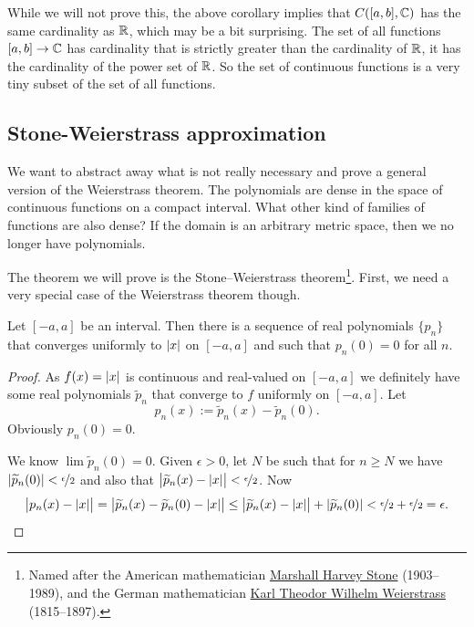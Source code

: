 \begin{remark}
While we will not prove this, the above corollary implies that
$C([a,b],{\mathbb{C}})$ has the same cardinality as ${\mathbb{R}}$, which may be a
bit surprising.  The set of all functions $[a,b] \to {\mathbb{C}}$ has
cardinality that is strictly greater than the cardinality of ${\mathbb{R}}$, it has the
cardinality of the power set of ${\mathbb{R}}$.  So the
set of continuous functions is a very tiny subset of the set of all
functions.
\end{remark}

\subsection{Stone-Weierstrass approximation}

We want to abstract away what is not really
necessary and prove a general version of the Weierstrass theorem.
The polynomials are dense in the space of continuous
functions on a compact interval.  What other kind of families of
functions are also dense?  If the domain is an
arbitrary metric space, then we no longer have polynomials.

The theorem we will prove is the Stone--Weierstrass theorem\footnote{%
Named after the American mathematician
\href{http://en.wikipedia.org/wiki/Marshall_Harvey_Stone}{Marshall Harvey Stone}
(1903--1989), and the German mathematician
\href{http://en.wikipedia.org/wiki/Karl_Weierstrass}{Karl Theodor Wilhelm Weierstrass}
(1815--1897).}.
First,
we need a very
special case of the Weierstrass theorem though.

\begin{cor}
Let $[-a,a]$ be an interval.  Then there is a sequence of real polynomials
$\{ p_n \}$ that converges uniformly to $\lvert {x} \rvert$ on $[-a,a]$ and such that
$p_n(0) = 0$ for all $n$.
\end{cor}

\begin{proof}
As $f(x) = \lvert {x} \rvert$ is continuous and real-valued
on $[-a,a]$ we definitely have some
real polynomials $\widetilde{p}_n$ that converge to $f$
uniformly on $[-a,a]$.
Let
\begin{equation*}
p_n(x) := \widetilde{p}_n(x) - \widetilde{p}_n(0) .
\end{equation*}
Obviously $p_n(0) = 0$.

We know
$\lim \widetilde{p}_n(0) = 0$.  Given $\epsilon > 0$, let $N$ be such that
for $n \geq N$ we have $\lvert {\widetilde{p}_n(0)} \rvert < \nicefrac{\epsilon}{2}$
and also that $\bigl\lvert\widetilde{p}_n(x)-\lvert {x} \rvert\big\rvert < \nicefrac{\epsilon}{2}$.
Now
\begin{equation*}
\bigl\lvert p_n(x)-\lvert {x} \rvert \bigr\rvert
=
\bigl\lvert \widetilde{p}_n(x) - \widetilde{p}_n(0) - \lvert {x} \rvert \bigr\rvert
\leq
\bigl\lvert \widetilde{p}_n(x) - \lvert {x} \rvert \bigr\rvert + \lvert {\widetilde{p}_n(0)} \rvert < 
\nicefrac{\epsilon}{2} + \nicefrac{\epsilon}{2} = \epsilon . \qedhere
\end{equation*}
\end{proof}

